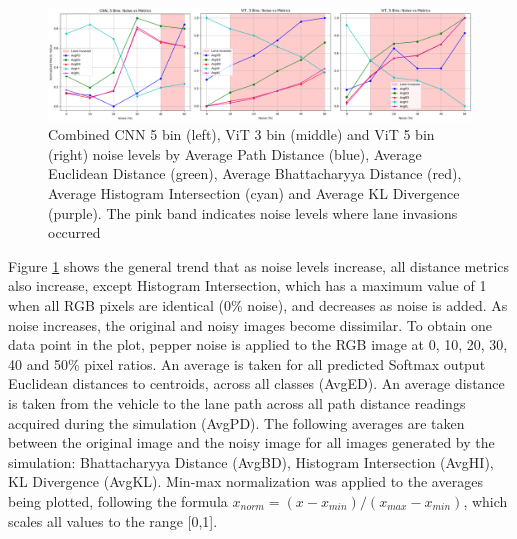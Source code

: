  
\begin{figure}[H]
    \centering
    \includegraphics[width=1.0\linewidth]{Figures/Results/combined_cnn_5bin_vit_3bin_vit_5bin_noise_distance_metrics.png}
    \caption{Combined CNN 5 bin (left), ViT 3 bin (middle) and ViT 5 bin (right) noise levels by Average Path Distance (blue), Average Euclidean Distance (green), Average Bhattacharyya Distance (red), Average Histogram Intersection (cyan) and Average KL Divergence (purple). The pink band indicates noise levels where lane invasions occurred}
    \label{fig:combined_cnn_5bin_vit_3bin_vit_5bin_noise_distance_metrics}
\end{figure}

Figure \ref{fig:combined_cnn_5bin_vit_3bin_vit_5bin_noise_distance_metrics} shows the general trend that as noise levels increase, all distance metrics also increase, except Histogram Intersection, which has a maximum value of 1 when all RGB pixels are identical (0\% noise), and decreases as noise is added. As noise increases, the original and noisy images become dissimilar.
To obtain one data point in the plot, pepper noise is applied to the RGB image at 0, 10, 20, 30, 40 and 50\% pixel ratios. An average is taken for all predicted Softmax output Euclidean distances to centroids, across all classes (AvgED). An average distance is taken from the vehicle to the lane path across all path distance readings acquired during the simulation (AvgPD). The following averages are taken between the original image and the noisy image for all images generated by the simulation: Bhattacharyya Distance (AvgBD), Histogram Intersection (AvgHI), KL Divergence (AvgKL). Min-max normalization was applied to the averages being plotted, following the formula $x_{norm} = (x - x_{min}) / (x_{max} - x_{min})$, which scales all values to the range [0,1].

